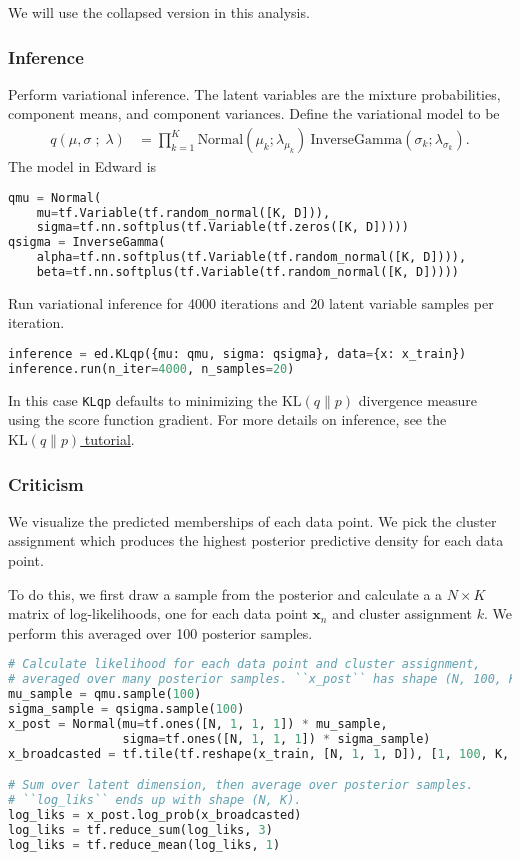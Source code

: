 We will use the collapsed version in this analysis.


\subsubsection{Inference}
Perform variational inference.
%
The latent variables are the mixture probabilities,
component means, and component variances.
Define the variational model to be
\begin{align*}
 q(\mu, \sigma \;;\; \lambda)
 &=
 \prod_{k=1}^K
 \text{Normal}(\mu_k; \lambda_{\mu_k})
 ~
 \text{InverseGamma}(\sigma_k; \lambda_{\sigma_k}).
\end{align*}
The model in Edward is
\begin{lstlisting}[language=Python]
qmu = Normal(
    mu=tf.Variable(tf.random_normal([K, D])),
    sigma=tf.nn.softplus(tf.Variable(tf.zeros([K, D]))))
qsigma = InverseGamma(
    alpha=tf.nn.softplus(tf.Variable(tf.random_normal([K, D]))),
    beta=tf.nn.softplus(tf.Variable(tf.random_normal([K, D]))))
\end{lstlisting}

Run variational inference for 4000 iterations and 20 latent variable
samples per iteration.
\begin{lstlisting}[language=Python]
inference = ed.KLqp({mu: qmu, sigma: qsigma}, data={x: x_train})
inference.run(n_iter=4000, n_samples=20)
\end{lstlisting}
In this case
\texttt{KLqp} defaults to minimizing the
$\text{KL}(q\|p)$ divergence measure using the score function
gradient.
For more details on inference, see the \href{/tutorials/klqp}{$\text{KL}(q\|p)$ tutorial}.


\subsubsection{Criticism}

We visualize the predicted memberships of each data point. We pick
the cluster assignment which produces the highest posterior predictive
density for each data point.

To do this, we first draw a sample from the posterior and calculate a
a $N\times K$ matrix of log-likelihoods, one for each data point
$\mathbf{x}_n$ and cluster assignment $k$.
We perform this averaged over 100 posterior samples.

\begin{lstlisting}[language=Python]
# Calculate likelihood for each data point and cluster assignment,
# averaged over many posterior samples. ``x_post`` has shape (N, 100, K, D).
mu_sample = qmu.sample(100)
sigma_sample = qsigma.sample(100)
x_post = Normal(mu=tf.ones([N, 1, 1, 1]) * mu_sample,
                sigma=tf.ones([N, 1, 1, 1]) * sigma_sample)
x_broadcasted = tf.tile(tf.reshape(x_train, [N, 1, 1, D]), [1, 100, K, 1])

# Sum over latent dimension, then average over posterior samples.
# ``log_liks`` ends up with shape (N, K).
log_liks = x_post.log_prob(x_broadcasted)
log_liks = tf.reduce_sum(log_liks, 3)
log_liks = tf.reduce_mean(log_liks, 1)
\end{lstlisting}

